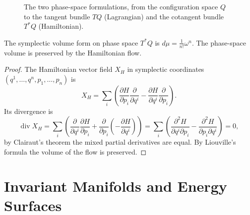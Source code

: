 \begin{figure}[htbp]
\centering
{}
\caption{The two phase-space formulations, from the configuration space $Q$ to the tangent bundle $TQ$ (Lagrangian) and the cotangent bundle $T^*Q$ (Hamiltonian).}
\label{fig:phase_space}
\end{figure}

\begin{proposition}\label{prop:phase_volume_liouville}
The symplectic volume form on phase space $T^*Q$ is $d\mu = \frac{1}{n!}\omega^n$. The phase-space volume is preserved by the Hamiltonian flow.
\end{proposition}

\begin{proof}
The Hamiltonian vector field $X_H$ in symplectic coordinates $(q^1, \dots, q^n, p_1, \dots, p_n)$ is
\[
X_H = \sum_i \left( \frac{\partial H}{\partial p_i} \frac{\partial}{\partial q^i} - \frac{\partial H}{\partial q^i} \frac{\partial}{\partial p_i} \right).
\]
Its divergence is
\[
\operatorname{div} X_H = \sum_i \left( \frac{\partial}{\partial q^i} \frac{\partial H}{\partial p_i} + \frac{\partial}{\partial p_i} \left( -\frac{\partial H}{\partial q^i} \right) \right) = \sum_i \left( \frac{\partial^2 H}{\partial q^i \partial p_i} - \frac{\partial^2 H}{\partial p_i \partial q^i} \right) = 0,
\]
by Clairaut's theorem the mixed partial derivatives are equal. By Liouville's formula the volume of the flow is preserved.
\end{proof}

\section{Invariant Manifolds and Energy Surfaces}

